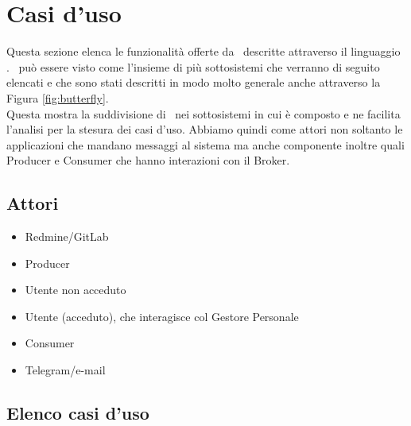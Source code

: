 \newpage
\section{Casi d'uso}
Questa sezione elenca le funzionalità offerte da \progetto\ descritte attraverso il linguaggio .
\progetto\ può essere visto come l'insieme di più sottosistemi che verranno di seguito elencati e che sono stati descritti in modo molto generale anche attraverso la Figura \ref{fig:butterfly}.\\
Questa mostra la suddivisione di \progetto\ nei sottosistemi in cui è composto e ne facilita l'analisi per la stesura dei casi d'uso.
Abbiamo quindi come attori non soltanto le applicazioni che mandano messaggi al sistema ma anche componente inoltre quali Producer e Consumer che hanno interazioni con il Broker.
	
	\subsection{Attori}
	\begin{itemize}
		\item Redmine/GitLab
		\item Producer
		\item Utente non acceduto
		\item Utente (acceduto), che interagisce col Gestore Personale
		\item Consumer
		\item Telegram/e-mail
	\end{itemize}
	
	\subsection{Elenco casi d'uso}
















